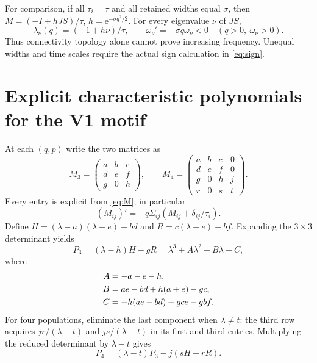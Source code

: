 \documentclass[11pt]{article}
\newcommand{\ee}{\mathrm e}
\begin{document}
For comparison, if all $\tau_i=\tau$ and all retained widths equal $\sigma$,
then $M=(-I+hJS)/\tau$, $h=\ee^{-\sigma q^2/2}$.
For every eigenvalue $\nu$ of $JS$,
\begin{equation}
 \lambda_\nu(q)=(-1+h\nu)/\tau,\qquad
 \omega_\nu'=-\sigma q\omega_\nu<0\quad(q>0,\ \omega_\nu>0).
\end{equation}
Thus connectivity topology alone cannot prove increasing frequency. Unequal
widths and time scales require the actual sign calculation in \eqref{eq:sign}.

\newpage
\section{Explicit characteristic polynomials for the V1 motif}
At each $(q,p)$ write the two matrices as
\begin{equation}
 M_3=\begin{pmatrix}a&b&c\\d&e&f\\g&0&h\end{pmatrix},\qquad
 M_4=\begin{pmatrix}a&b&c&0\\d&e&f&0\\g&0&h&j\\r&0&s&t\end{pmatrix}.
 \label{eq:sparse}
\end{equation}
Every entry is explicit from \eqref{eq:M}; in particular
\begin{equation}
 (M_{ij})'=-q\Sigma_{ij}(M_{ij}+\delta_{ij}/\tau_i).
 \label{eq:entries}
\end{equation}
Define $H=(\lambda-a)(\lambda-e)-bd$ and $R=c(\lambda-e)+bf$.
Expanding the $3\times3$ determinant yields
\begin{equation}
 P_3=(\lambda-h)H-gR=\lambda^3+A\lambda^2+B\lambda+C,
 \label{eq:cubic}
\end{equation}
where
\begin{align}
 A&=-a-e-h,\notag\\
 B&=ae-bd+h(a+e)-gc,\notag\\
 C&=-h(ae-bd)+gce-gbf. \label{eq:abc}
\end{align}
For four populations, eliminate the last component when $\lambda\ne t$:
the third row acquires $jr/(\lambda-t)$ and $js/(\lambda-t)$ in its first
and third entries. Multiplying the reduced determinant by $\lambda-t$ gives
\begin{equation}
 \boxed{P_4=(\lambda-t)P_3-j(sH+rR)}.
 \label{eq:quartic}
\end{equation}
\end{document}
